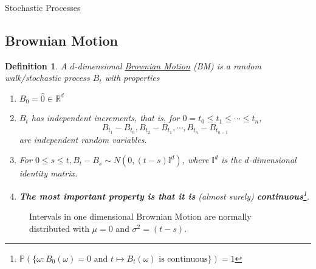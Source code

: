 \documentclass[12pt]{article}
\newtheorem{definition}{Definition}
\newcommand{\Emmett}[5]{%
\draw[#4] (0,0)
\foreach \x in {1,...,#1}
{   -- ++(#2,rand*#3+0.001)
}
node[right] {#5};
}
\begin{document}
\begin{section}{Stochastic Processes}
\subsection{Brownian Motion}

\begin{definition} A $d$-dimensional \underline{Brownian Motion} (BM) is a random walk/stochastic process $B_t$ with properties
\begin{enumerate}
	\item $B_0 =  \hat{0} \in \mathbb R^d$
	\item $B_t$ has independent increments, that is, for $0 = t_0 \leq t_1 \leq \cdots \leq t_n$,
		\begin{equation*}
			B_{t_1} - B_{t_0}, B_{t_2} - B_{t_1}, \cdots, B_{t_n} - B_{t_{n-1}}
		\end{equation*}
		are independent random variables.
	\item For $0 \leq s \leq t, B_t - B_s \sim N(0, (t - s)\mathbb I^d)$, where $\mathbb I^d$ is the $d$-dimensional identity matrix.
	\item {\bf The most important property is that it is} (almost surely) {\bf continuous}\footnote{$\mathbb P(\{\omega : B_0(\omega) = 0 \text{ and } t \mapsto B_t(\omega) \text{ is continuous}\}) = 1$}.
\end{enumerate}
\end{definition}

\begin{figure}[h!]
\centering
{}
\caption{Intervals in one dimensional Brownian Motion are normally distributed with $\mu = 0$ and $\sigma^2 = (t - s)$.}
\end{figure}



\end{section}
\end{document}
